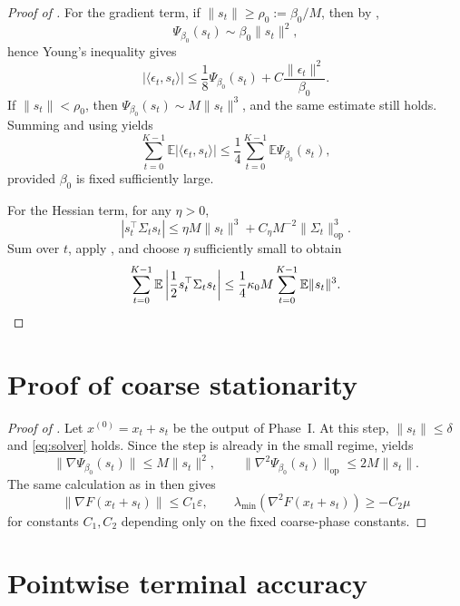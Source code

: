 \documentclass{article}
\theoremstyle{plain}
\theoremstyle{definition}
\theoremstyle{remark}
\begin{document}
\begin{proof}[Proof of ]
For the gradient term, if \(\|s_t\|\ge \rho_0:=\beta_0/M\), then by ,
\[
\Psi_{\beta_0}(s_t)\sim \beta_0\|s_t\|^2,
\]
hence Young's inequality gives
\[
|\langle \epsilon_t,s_t\rangle|
\le
\frac18\Psi_{\beta_0}(s_t)+C\frac{\|\epsilon_t\|^2}{\beta_0}.
\]
If \(\|s_t\|<\rho_0\), then \(\Psi_{\beta_0}(s_t)\sim M\|s_t\|^3\), and the same estimate still holds. Summing and using  yields
\[
\sum_{t=0}^{K-1}\mathbb E|\langle \epsilon_t,s_t\rangle|
\le
\frac14\sum_{t=0}^{K-1}\mathbb E \Psi_{\beta_0}(s_t),
\]
provided \(\beta_0\) is fixed sufficiently large.

For the Hessian term, for any \(\eta>0\),
\[
|s_t^\top \Sigma_t s_t|
\le
\eta M\|s_t\|^3 + C_\eta M^{-2}\|\Sigma_t\|_{\mathrm{op}}^3.
\]
Sum over \(t\), apply , and choose \(\eta\) sufficiently small to obtain
\[
\sum_{t=0}^{K-1}\mathbb E\left|\frac12 s_t^\top \Sigma_t s_t\right|
\le
\frac14\kappa_0 M\sum_{t=0}^{K-1}\mathbb E\|s_t\|^3.
\qedhere
\]
\end{proof}

\section{Proof of coarse stationarity}\label{app:coarse}

\begin{proof}[Proof of ]
Let \(x^{(0)}=x_t+s_t\) be the output of Phase~I. At this step, \(\|s_t\|\le \delta\) and \eqref{eq:solver} holds. Since the step is already in the small regime,  yields
\[
\|\nabla\Psi_{\beta_0}(s_t)\|\le M\|s_t\|^2,
\qquad
\|\nabla^2\Psi_{\beta_0}(s_t)\|_{\mathrm{op}}\le 2M\|s_t\|.
\]
The same calculation as in  then gives
\[
\|\nabla F(x_t+s_t)\|\le C_1 \varepsilon,
\qquad
\lambda_{\min}(\nabla^2F(x_t+s_t))\ge -C_2\mu
\]
for constants \(C_1,C_2\) depending only on the fixed coarse-phase constants.
\end{proof}

\section{Pointwise terminal accuracy}\label{app:pointwise}
\end{document}
